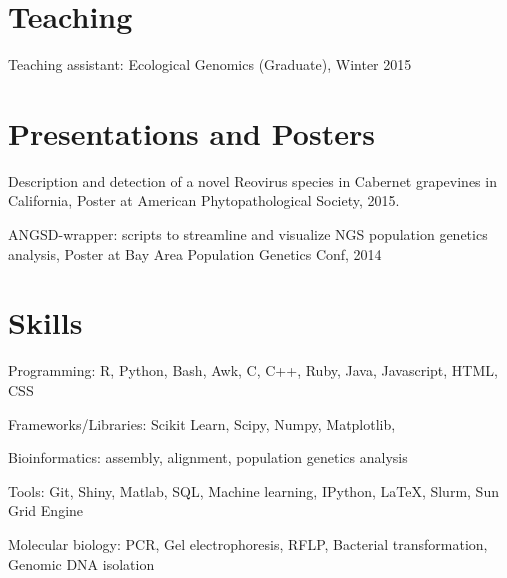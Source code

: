 \documentclass[letterpaper]{article}
\renewenvironment{itemize}{
  \begin{list}{}{
    \setlength{\leftmargin}{1.5em}
  }
}{
  \end{list}
}
\begin{document}
\section*{Teaching}
\begin{itemize}
\item Teaching assistant: Ecological Genomics (Graduate), Winter 2015
\end{itemize}

\section*{Presentations and Posters}
\begin{itemize}
\item Description and detection of a novel Reovirus species in Cabernet grapevines in California, Poster at American Phytopathological Society, 2015.
\item ANGSD-wrapper: scripts to streamline and visualize NGS population genetics analysis, Poster at Bay Area Population Genetics Conf, 2014
\end{itemize}

\section*{Skills}
\begin{itemize}
\item Programming: R, Python, Bash, Awk, C, C++, Ruby, Java, Javascript, HTML, CSS
\item Frameworks/Libraries: Scikit Learn, Scipy, Numpy, Matplotlib, 
\item Bioinformatics: assembly, alignment, population genetics analysis
\item Tools: Git, Shiny, Matlab, SQL, Machine learning, IPython, LaTeX, Slurm, Sun Grid Engine
\item Molecular biology: PCR, Gel electrophoresis, RFLP, Bacterial transformation, Genomic DNA isolation
\end{itemize}
\end{document}
